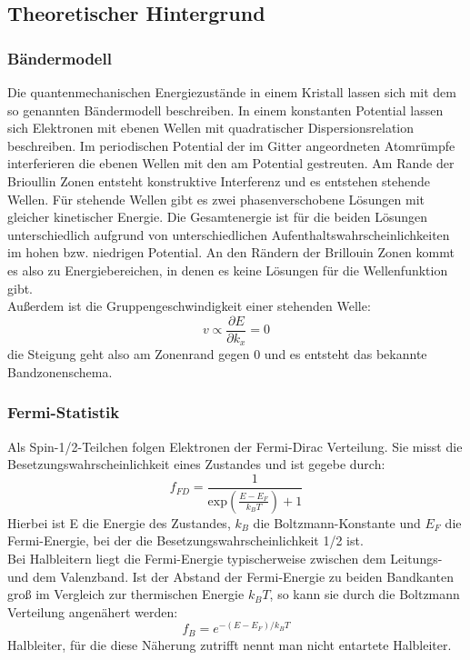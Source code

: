 
\subsection{Theoretischer Hintergrund}
\subsubsection{Bändermodell}
Die quantenmechanischen Energiezustände in einem Kristall lassen sich mit dem so genannten Bändermodell beschreiben.
In einem konstanten Potential lassen sich Elektronen mit ebenen Wellen mit quadratischer Dispersionsrelation beschreiben. 
Im periodischen Potential der im Gitter angeordneten Atomrümpfe interferieren die ebenen Wellen mit den am Potential gestreuten.
Am Rande der Brioullin Zonen entsteht konstruktive Interferenz und es entstehen stehende Wellen. Für stehende Wellen gibt es zwei phasenverschobene Lösungen mit gleicher kinetischer Energie. Die Gesamtenergie ist für die beiden Lösungen unterschiedlich aufgrund von unterschiedlichen Aufenthaltswahrscheinlichkeiten im hohen bzw. niedrigen Potential.
An den Rändern der Brillouin Zonen kommt es also zu Energiebereichen, in denen es keine Lösungen für die Wellenfunktion gibt.\\
Außerdem ist die Gruppengeschwindigkeit einer stehenden Welle:
$$v \propto \frac{\partial E}{\partial k_x} = 0$$
die Steigung geht also am Zonenrand gegen $0$ und es entsteht das bekannte Bandzonenschema.


\subsubsection{Fermi-Statistik}
Als Spin-1/2-Teilchen folgen Elektronen der Fermi-Dirac Verteilung. Sie misst die Besetzungswahrscheinlichkeit eines Zustandes und ist gegebe durch:
$$f_{FD} = \frac{1}{\mathrm{exp}(\frac{E-E_F}{k_B T})+1} $$
Hierbei ist E die Energie des Zustandes, $k_B$ die Boltzmann-Konstante und $E_F$ die Fermi-Energie, bei der die Besetzungswahrscheinlichkeit 1/2 ist. \\
Bei Halbleitern liegt die Fermi-Energie typischerweise zwischen dem Leitungs- und dem Valenzband. Ist der Abstand der Fermi-Energie zu beiden Bandkanten groß im Vergleich zur thermischen Energie $k_B T$, so kann sie durch die Boltzmann Verteilung angenähert werden:
$$f_{B} = e^{-(E-E_F) / k_B T}$$
Halbleiter, für die diese Näherung zutrifft nennt man nicht entartete Halbleiter.

